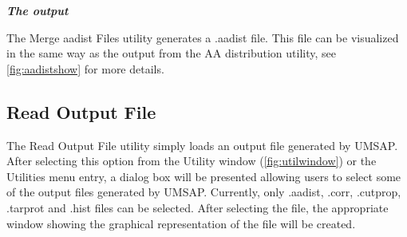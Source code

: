 \textit{\textbf{The output}} 

The Merge aadist Files utility generates a .aadist file. This file can be visualized in the same way as the output from the AA distribution utility, see \autoref{fig:aadistshow} for more details.

\subsection{Read Output File}
\label{subsec:readOutF}

The Read Output File utility simply loads an output file generated by UMSAP. After selecting this option from the Utility window (\autoref{fig:utilwindow}) or the Utilities menu entry, a dialog box will be presented allowing users to select some of the output files generated by UMSAP. Currently, only .aadist, .corr, .cutprop, .tarprot and .hist files can be selected. After selecting the file, the appropriate window showing the graphical representation of the file will be created. 